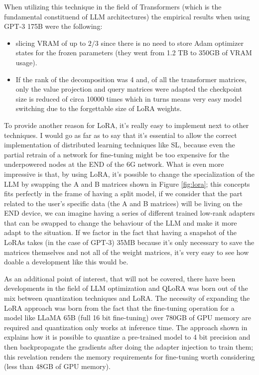 When utilizing this technique in the field of Transformers (which is the fundamental constituend of
LLM architectures) the empirical results when using GPT-3 175B were the following:
\begin{itemize}
	\item slicing VRAM of up to $2/3$ since there is no need to store Adam optimizer states for
	      the frozen parameters (they went from 1.2 TB to 350GB of VRAM usage).
	\item If the rank of the decomposition was 4 and, of all the transformer matrices, only the
	      value projection and query matrices were adapted the checkpoint size is reduced of
	      circa 10000 times which in turns means very easy model switching due to the
	      forgettable size of LoRA weights.
\end{itemize}
To provide another reason for LoRA, it's really easy to implement next to other techniques. I would
go as far as to say that it's essential to allow the correct implementation of distributed
learning techniques like SL, because even the partial retrain of a network for fine-tuning might be
too expensive for the underpowered nodes at the END of the 6G network. What is even more impressive
is that, by using LoRA, it's possible to change the specialization of the LLM by swapping the A and
B matrices shown in Figure \ref{fig:lora}; this concepts fits perfectly in the frame of having a
split model, if we consider that the part related to the user's specific data (the A and B matrices)
will be living on the END device, we can imagine having a series of different trained low-rank
adapters that can be swapped to change the behaviour of the LLM and make it more adapt to the
situation. If we factor in the fact that having a snapshot of the LoRAs takes (in the case of GPT-3)
35MB because it's only necessary to save the matrices themselves and not all of the weight matrices,
it's very easy to see how doable a development like this would be.

As an additional point of interest, that will not be covered, there have been developments in the
field of LLM optimization and QLoRA was born out of the mix between quantization techniques and
LoRA. The necessity of expanding the LoRA approach was born from the fact that the fine-tuning
operation for a model like LLaMA 65B (full 16 bit fine-tuning) over 780GB of GPU memory are required
and quantization only works at inference time. The approach shown in \cite{qlora} explains how it is
possible to quantize a pre-trained model to 4 bit precision and then backpropagate the gradients
after doing the adapter injection to train them; this revelation renders the memory requirements for
fine-tuning worth considering (less than 48GB of GPU memory).
